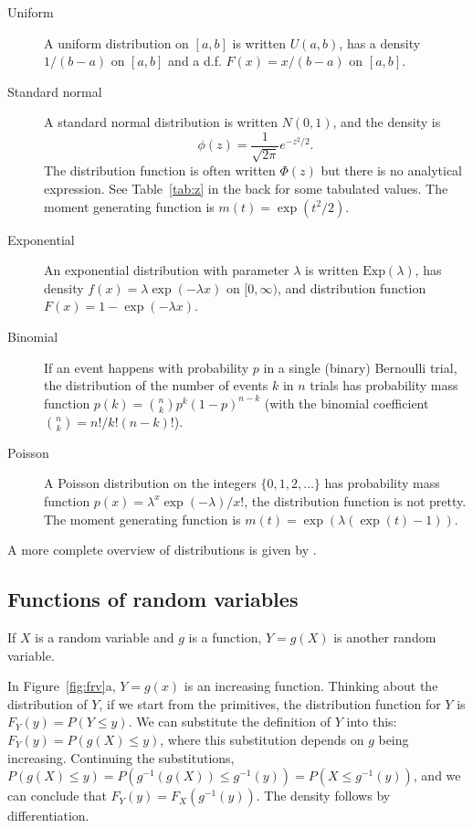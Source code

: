 \documentclass[twoside]{article}
\begin{document}
\begin{description}
\item[Uniform] A uniform distribution on $[a,b]$ is written $U(a,b)$, has a density $1/(b-a)$ on $[a,b]$ and 
a d.f. $F(x)=x/(b-a)$ on $[a,b]$. 
\item[Standard normal] A standard normal distribution is written $N(0,1)$, and the density is 
\[ \phi(z) = \frac{1}{\sqrt{2\pi}} e^{-z^2/2}.\] The distribution function is often written $\Phi(z)$ but
there is no analytical expression. See Table~\ref{tab:z} in the back for some tabulated values.
The moment generating function is $m(t) = \exp(t^2/2)$.
\item[Exponential] An exponential distribution with parameter $\lambda$ is written $\mathrm{Exp}(\lambda)$, 
has density $f(x)=\lambda \exp(-\lambda  x)$ on $[0,\infty)$, and distribution function $F(x)=1- \exp(-\lambda x)$.
\item[Binomial] If an event happens with probability $p$ in a single (binary)
Bernoulli trial, the distribution of the number of events $k$ in $n$ trials has
probability mass function $p(k) = \binom{n}{k} p^k (1-p)^{n-k}$ (with the
binomial coefficient $\binom{n}{k} = n!/k!(n-k)!$).
\item[Poisson] A Poisson distribution on the integers $\{0,1,2,\dots\}$ has probability mass function 
$p(x) = \lambda^x \exp(-\lambda)/x!$, the distribution function is not pretty. The moment generating function
is $m(t) = \exp(\lambda( \exp(t) -1))$.
\end{description}

A more complete overview of distributions is given by \citet{Leemis2008}.

\subsection{Functions of random variables}
If $X$ is a random variable and $g$ is a function, $Y=g(X)$ is another random variable.

In Figure~\ref{fig:frv}a, $Y=g(x)$ is an increasing function. 
Thinking about the distribution of $Y$, if we start from the primitives,
the distribution function for $Y$ is $F_Y(y) = P(Y\leq y)$. We can substitute
the definition of $Y$ into this: $F_Y(y) = P(g(X)\leq y)$, where this
substitution depends on $g$ being increasing. Continuing
the substitutions, $P(g(X) \leq y) = P( g^{-1}(g(X)) \leq g^{-1}(y)) = P(X\leq g^{-1}(y))$,
and we can conclude that $F_Y(y)= F_X(g^{-1}(y))$. The density follows by differentiation.
\end{document}

